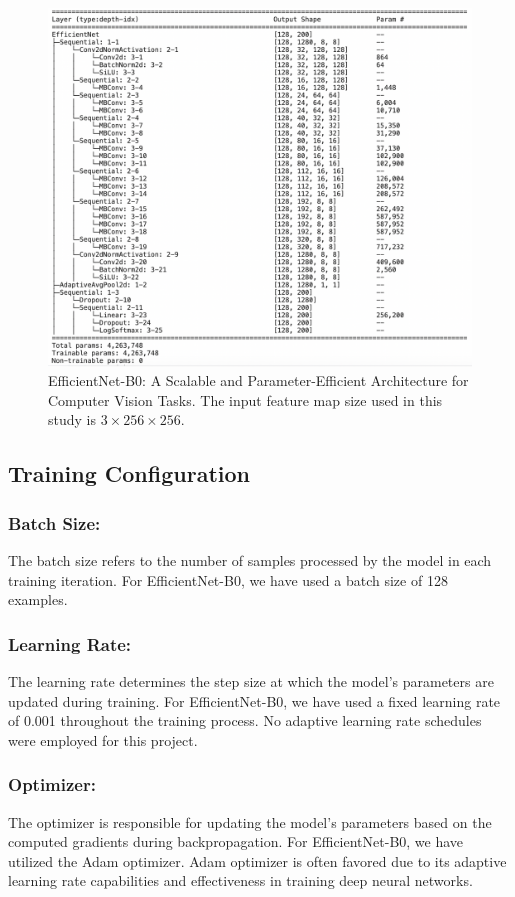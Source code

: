 \documentclass[12pt, a4paper, twoside]{article}
\begin{document}
			\begin{figure}[h]
				\centering
				\includegraphics[width=\textwidth]{enb0-arc-details}
				\caption{EfficientNet-B0: A Scalable and Parameter-Efficient Architecture for Computer Vision Tasks. The input feature map size used in this study is $3 \times 256 \times 256$.}
				\label{F:enb0-arc-details}
			\end{figure}
			
		\subsection{Training Configuration}
			\subsubsection{Batch Size:}
				The batch size refers to the number of samples processed by the model in each training iteration. For EfficientNet-B0, we have used a batch size of 128 examples.
				
			\subsubsection{Learning Rate:}
				The learning rate determines the step size at which the model's parameters are updated during training. For EfficientNet-B0, we have used a fixed learning rate of 0.001 throughout the training process. No adaptive learning rate schedules were employed for this project.
				
			\subsubsection{Optimizer:}
				The optimizer is responsible for updating the model's parameters based on the computed gradients during backpropagation. For EfficientNet-B0, we have utilized the Adam optimizer. Adam optimizer is often favored due to its adaptive learning rate capabilities and effectiveness in training deep neural networks.
				
\end{document}
